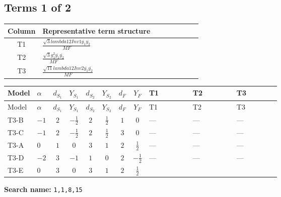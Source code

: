 \documentclass[8pt]{article}
\begin{document}
\begin{landscape}
\subsection*{Terms 1 of 2}
\begin{center}
\begin{tabular}{@{}c >{\raggedright\arraybackslash}p{0.82\linewidth}@{}}
\toprule
Column & Representative term structure \\
\midrule
T1 & \(\displaystyle \frac{\sqrt{3} lambda12Inv1 \overline{y_{1}} \overline{y_{2}}}{MF}\) \\
\midrule
T2 & \(\displaystyle \frac{\sqrt{3} g_{1}^{2} \overline{y_{1}} \overline{y_{2}}}{MF}\) \\
\midrule
T3 & \(\displaystyle \frac{\sqrt{11} lambda12Inv2 \overline{y_{1}} \overline{y_{2}}}{MF}\) \\
\midrule
\bottomrule
\end{tabular}
\end{center}
\smallskip
\tiny
\begin{longtable}{@{}llcccccc >{\raggedright\arraybackslash}p{0.21\linewidth} >{\raggedright\arraybackslash}p{0.21\linewidth} >{\raggedright\arraybackslash}p{0.21\linewidth}@{}}
\toprule
Model & $\alpha$ & $d_{S_1}$ & $Y_{S_1}$ & $d_{S_2}$ & $Y_{S_2}$ & $d_F$ & $Y_F$ & T1 & T2 & T3 \\
\midrule
\endfirsthead
\toprule
Model & $\alpha$ & $d_{S_1}$ & $Y_{S_1}$ & $d_{S_2}$ & $Y_{S_2}$ & $d_F$ & $Y_F$ & T1 & T2 & T3 \\
\midrule
\endhead
T3-B & $-1$ & $2$ & $-\frac{1}{2}$ & $2$ & $\frac{1}{2}$ & $1$ & $0$ & --- & --- & --- \\
\midrule
T3-C & $-1$ & $2$ & $-\frac{1}{2}$ & $2$ & $\frac{1}{2}$ & $3$ & $0$ & --- & --- & --- \\
\midrule
T3-A & $0$ & $1$ & $0$ & $3$ & $1$ & $2$ & $\frac{1}{2}$ & --- & --- & --- \\
\midrule
T3-D & $-2$ & $3$ & $-1$ & $1$ & $0$ & $2$ & $-\frac{1}{2}$ & --- & --- & --- \\
\midrule
T3-E & $0$ & $3$ & $0$ & $3$ & $1$ & $2$ & $\frac{1}{2}$ & \scriptsize\adjustbox{max width=\linewidth}{$\begin{gathered} - \frac{\sqrt{3} lambda12Inv1 \overline{y_{1}} \overline{y_{2}}}{6 MF}\end{gathered}$} & \scriptsize\adjustbox{max width=\linewidth}{$\begin{gathered} \frac{\sqrt{3} g_{1}^{2} \overline{y_{1}} \overline{y_{2}}}{8 MF}\end{gathered}$} & \scriptsize\adjustbox{max width=\linewidth}{$\begin{gathered} \frac{3 \sqrt{11} lambda12Inv2 \overline{y_{1}} \overline{y_{2}}}{22 MF}\end{gathered}$} \\
\midrule
\bottomrule
\end{longtable}
\clearpage
\noindent\textbf{Search name: }\texttt{1,1,8,15}\par\smallskip

\end{landscape}
\end{document}
